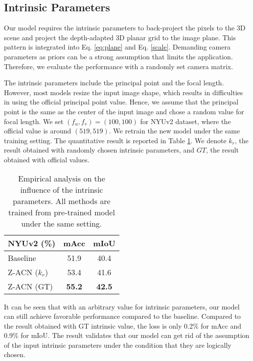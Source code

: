 \documentclass[lettersize,journal]{IEEEtran}
\begin{document}
\subsection{Intrinsic Parameters}

Our model requires the intrinsic parameters to back-project the pixels to the 3D scene and project the depth-adapted 3D planar grid to the image plane. This pattern is integrated into Eq. \ref{eq:plane} and Eq. \ref{scale}. Demanding camera parameters as priors can be a strong assumption that limits the application. Therefore, we evaluate the performance with a randomly set camera matrix.

The intrinsic parameters include the principal point and the focal length. However, most models resize the input image shape, which results in difficulties in using the official principal point value. Hence, we assume that the principal point is the same as the center of the input image and chose a random value for focal length. We set $(f_u, f_v) = (100, 100)$ for NYUv2 dataset, where the official value is around $(519, 519)$. We retrain the new model under the same training setting. The quantitative result is reported in Table \ref{intrinsic}. We denote $k_r$, the result obtained with randomly chosen intrinsic parameters, and $GT$, the result obtained with official values.

\begin{table}[t]
\centering
\setlength\tabcolsep{10pt}
\setlength\extrarowheight{0pt}
\caption{Empirical analysis on the influence of the intrinsic parameters. All methods are trained from pre-trained model under the same setting.}
\begin{tabular}[ht]{ l c c }
\hline

\hline
NYUv2 (\%)    & mAcc   &  mIoU    \\
\hline
Baseline &  51.9 &  40.4  \\
Z-ACN ($k_r$) &53.4 &  41.6\\
Z-ACN (GT) & \textbf{55.2} &  \textbf{42.5}  \\
\hline

\hline
\end{tabular}

\label{intrinsic}
\end{table}

It can be seen that with an arbitrary value for intrinsic parameters, our model can still achieve favorable performance compared to the baseline. Compared to the result obtained with GT intrinsic value, the loss is only 0.2\% for mAcc and 0.9\% for mIoU. The result validates that our model can get rid of the assumption of the input intrinsic parameters under the condition that they are logically chosen.
\end{document}
